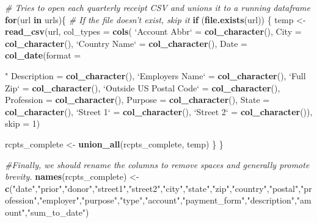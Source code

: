 \documentclass[
]{article}
\newenvironment{Shaded}{\begin{snugshade}}{\end{snugshade}}
\newcommand{\CommentTok}[1]{\textcolor[rgb]{0.56,0.35,0.01}{\textit{#1}}}
\newcommand{\ControlFlowTok}[1]{\textcolor[rgb]{0.13,0.29,0.53}{\textbf{#1}}}
\newcommand{\DataTypeTok}[1]{\textcolor[rgb]{0.13,0.29,0.53}{#1}}
\newcommand{\DecValTok}[1]{\textcolor[rgb]{0.00,0.00,0.81}{#1}}
\newcommand{\KeywordTok}[1]{\textcolor[rgb]{0.13,0.29,0.53}{\textbf{#1}}}
\newcommand{\NormalTok}[1]{#1}
\newcommand{\StringTok}[1]{\textcolor[rgb]{0.31,0.60,0.02}{#1}}
\begin{document}
\begin{Shaded}
\begin{Highlighting}[]
{{{{    \CommentTok{# Tries to open each quarterly receipt CSV and unions it to a running dataframe}
    \ControlFlowTok{for}\NormalTok{(url }\ControlFlowTok{in}\NormalTok{ urls)\{}
      \CommentTok{# If the file doesn't exist, skip it}
      \ControlFlowTok{if}\NormalTok{ (}\KeywordTok{file.exists}\NormalTok{(url)) \{}
\NormalTok{        temp <-}\StringTok{ }\KeywordTok{read_csv}\NormalTok{(url, }
          \DataTypeTok{col_types =} \KeywordTok{cols}\NormalTok{(}
            \StringTok{`}\DataTypeTok{Account Abbr}\StringTok{`}\NormalTok{ =}\StringTok{ }\KeywordTok{col_character}\NormalTok{(), }
              \DataTypeTok{City =} \KeywordTok{col_character}\NormalTok{(), }
            \StringTok{`}\DataTypeTok{Country Name}\StringTok{`}\NormalTok{ =}\StringTok{ }\KeywordTok{col_character}\NormalTok{(), }
              \DataTypeTok{Date =} \KeywordTok{col_date}\NormalTok{(}\DataTypeTok{format =} \StringTok{"%m/%d/%Y"}\NormalTok{), }
              \DataTypeTok{Description =} \KeywordTok{col_character}\NormalTok{(), }
            \StringTok{`}\DataTypeTok{Employers Name}\StringTok{`}\NormalTok{ =}\StringTok{ }\KeywordTok{col_character}\NormalTok{(), }
              \StringTok{`}\DataTypeTok{Full Zip}\StringTok{`}\NormalTok{ =}\StringTok{ }\KeywordTok{col_character}\NormalTok{(), }
            \StringTok{`}\DataTypeTok{Outside US Postal Code}\StringTok{`}\NormalTok{ =}\StringTok{ }\KeywordTok{col_character}\NormalTok{(), }
              \DataTypeTok{Profession =} \KeywordTok{col_character}\NormalTok{(), }
            \DataTypeTok{Purpose =} \KeywordTok{col_character}\NormalTok{(), }
              \DataTypeTok{State =} \KeywordTok{col_character}\NormalTok{(), }
            \StringTok{`}\DataTypeTok{Street 1}\StringTok{`}\NormalTok{ =}\StringTok{ }\KeywordTok{col_character}\NormalTok{(), }
              \StringTok{`}\DataTypeTok{Street 2}\StringTok{`}\NormalTok{ =}\StringTok{ }\KeywordTok{col_character}\NormalTok{()),}
          \DataTypeTok{skip =} \DecValTok{1}\NormalTok{)}
        
\NormalTok{        rcpts_complete <-}\StringTok{ }\KeywordTok{union_all}\NormalTok{(rcpts_complete, temp)}
\NormalTok{      \}}
\NormalTok{    \}}
    
    \CommentTok{#Finally, we should rename the columns to remove spaces and generally promote brevity.}
    \KeywordTok{names}\NormalTok{(rcpts_complete) <-}\StringTok{ }\KeywordTok{c}\NormalTok{(}\StringTok{"date"}\NormalTok{,}\StringTok{"prior"}\NormalTok{,}\StringTok{"donor"}\NormalTok{,}\StringTok{"street1"}\NormalTok{,}\StringTok{"street2"}\NormalTok{,}\StringTok{"city"}\NormalTok{,}\StringTok{"state"}\NormalTok{,}\StringTok{"zip"}\NormalTok{,}\StringTok{"country"}\NormalTok{,}\StringTok{"postal"}\NormalTok{,}\StringTok{"profession"}\NormalTok{,}\StringTok{"employer"}\NormalTok{,}\StringTok{"purpose"}\NormalTok{,}\StringTok{"type"}\NormalTok{,}\StringTok{"account"}\NormalTok{,}\StringTok{"payment_form"}\NormalTok{,}\StringTok{"description"}\NormalTok{,}\StringTok{"amount"}\NormalTok{,}\StringTok{"sum_to_date"}\NormalTok{)}
    
}}}}}
\end{Highlighting}
\end{Shaded}
\end{document}
